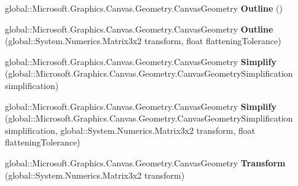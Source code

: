 \begin{DoxyCompactItemize}
\item 
\mbox{\label{class_microsoft_1_1_graphics_1_1_canvas_1_1_geometry_1_1_canvas_geometry_a2a21e622cb17f94954463d620c8ba650}} 
global\+::\+Microsoft.\+Graphics.\+Canvas.\+Geometry.\+Canvas\+Geometry {\bfseries Outline} ()
\item 
\mbox{\label{class_microsoft_1_1_graphics_1_1_canvas_1_1_geometry_1_1_canvas_geometry_adcb0f78086d81ae4f562717eb38c2207}} 
global\+::\+Microsoft.\+Graphics.\+Canvas.\+Geometry.\+Canvas\+Geometry {\bfseries Outline} (global\+::\+System.\+Numerics.\+Matrix3x2 transform, float flattening\+Tolerance)
\item 
\mbox{\label{class_microsoft_1_1_graphics_1_1_canvas_1_1_geometry_1_1_canvas_geometry_a6b1ed02a2f08b0b00376d6eaca06738f}} 
global\+::\+Microsoft.\+Graphics.\+Canvas.\+Geometry.\+Canvas\+Geometry {\bfseries Simplify} (global\+::\+Microsoft.\+Graphics.\+Canvas.\+Geometry.\+Canvas\+Geometry\+Simplification simplification)
\item 
\mbox{\label{class_microsoft_1_1_graphics_1_1_canvas_1_1_geometry_1_1_canvas_geometry_a75548d17512c7e4839b879a019ea52f2}} 
global\+::\+Microsoft.\+Graphics.\+Canvas.\+Geometry.\+Canvas\+Geometry {\bfseries Simplify} (global\+::\+Microsoft.\+Graphics.\+Canvas.\+Geometry.\+Canvas\+Geometry\+Simplification simplification, global\+::\+System.\+Numerics.\+Matrix3x2 transform, float flattening\+Tolerance)
\item 
\mbox{\label{class_microsoft_1_1_graphics_1_1_canvas_1_1_geometry_1_1_canvas_geometry_a294f720439af95f7c721bc3c6c501e66}} 
global\+::\+Microsoft.\+Graphics.\+Canvas.\+Geometry.\+Canvas\+Geometry {\bfseries Transform} (global\+::\+System.\+Numerics.\+Matrix3x2 transform)
\item 
\mbox{\label{class_microsoft_1_1_graphics_1_1_canvas_1_1_geometry_1_1_canvas_geometry_a4af4b0665650464ff178a62d44d41cd9}} 

\end{DoxyCompactItemize}
